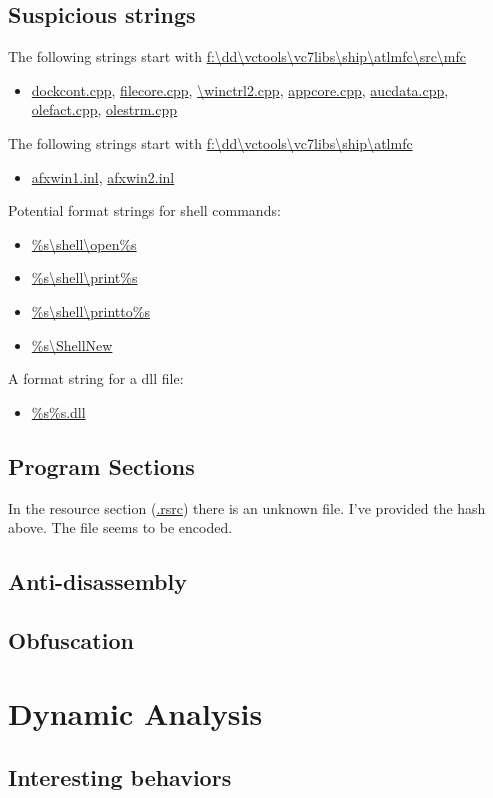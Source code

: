 \documentclass{article}
\begin{document}
    \subsection{Suspicious strings}
    The following strings start with \url{f:\dd\vctools\vc7libs\ship\atlmfc\src\mfc}
    \begin{itemize}
        \item \url{dockcont.cpp}, \url{filecore.cpp}, \url{\winctrl2.cpp}, \url{appcore.cpp}, \url{aucdata.cpp}, \url{olefact.cpp}, \url{olestrm.cpp}
    \end{itemize}
    The following strings start with \url{f:\dd\vctools\vc7libs\ship\atlmfc}
    \begin{itemize}
        \item \url{afxwin1.inl}, \url{afxwin2.inl}
    \end{itemize}
    Potential format strings for shell commands:
    \begin{itemize}
        \item \url{%s\shell\open\%s}
        \item \url{%s\shell\print\%s}
        \item \url{%s\shell\printto\%s}
        \item \url{%s\ShellNew}
    \end{itemize}
    A format string for a dll file:
    \begin{itemize}
        \item \url{%s%s.dll}
    \end{itemize}
    \subsection{Program Sections}
    In the resource section (\url{.rsrc}) there is an unknown file. I've provided the hash above. The file seems to be encoded.
    \subsection{Anti-disassembly}
    \subsection{Obfuscation}
    \pagebreak
    \section{Dynamic Analysis}
    \subsection{Interesting behaviors}
\end{document}

